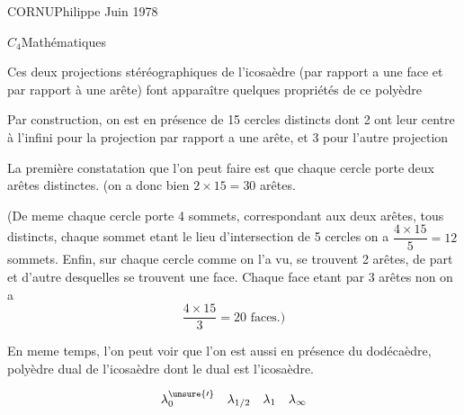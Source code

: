 
CORNU\qquad Philippe Juin 1978

$C_4$\quad Mathématiques


Ces deux projections stéréographiques de l'icosaèdre (par rapport a une face et par rapport à une arête) font apparaître quelques propriétés  de ce polyèdre

Par construction, on est en présence de 15 cercles distincts dont 2 ont leur centre à l'infini pour la projection par rapport a une arête, et 3 pour l'autre projection

La première constatation que l'on peut faire est que chaque cercle porte deux arêtes distinctes. (on a donc bien $2\times15=30$ arêtes.

(De meme chaque cercle porte 4 sommets, correspondant aux deux arêtes, tous distincts, chaque sommet etant le lieu d'intersection de 5 cercles on a $\dfrac{4\times15}{5}=12$ sommets. Enfin, sur chaque cercle comme on l'a vu, se trouvent 2 arêtes, de part et d'autre desquelles se trouvent une face. Chaque face etant  par 3 arêtes non  on a
\[
\frac{4\times15}{3}=20\text{ faces.})
\]

En meme temps, l'on peut voir que l'on est aussi en présence du dodécaèdre, polyèdre dual de l'icosaèdre dont le dual est l'icosaèdre.


\[
\lambda_0^{\unsure{\prime}}\quad\lambda_{1/2}\quad\lambda_1\quad\lambda_\infty
\]


